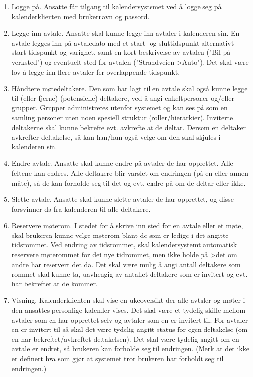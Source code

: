\begin{enumerate}

\item
Logge på. Ansatte får tilgang til kalendersystemet ved å logge seg på kalenderklienten med brukernavn og passord.

\item
Legge inn avtale. Ansatte skal kunne legge inn avtaler i kalenderen sin. En avtale legges inn på avtaledato med et start- og sluttidspunkt alternativt start-tidspunkt og varighet, samt en kort beskrivelse av avtalen ("Bil på verksted") og eventuelt sted for avtalen ("Strandveien
>Auto"). Det skal være lov å legge inn flere avtaler for overlappende tidspunkt.

\item
Håndtere møtedeltakere. Den som har lagt til en avtale skal også kunne legge til (eller fjerne) (potensielle) deltakere, ved å angi enkeltpersoner og/eller grupper. Grupper administreres utenfor systemet og kan ses på som en samling personer uten noen spesiell struktur (roller/hierarkier). Inviterte deltakerne skal kunne bekrefte evt. avkrefte at de deltar. Dersom en deltaker avkrefter deltakelse, så kan han/hun også velge om den skal skjules i kalenderen sin.

\item
Endre avtale. Ansatte skal kunne endre på avtaler de har opprettet. Alle feltene kan endres. Alle deltakere blir varslet om endringen (på en eller annen måte), så de kan forholde seg til det og evt. endre på om de deltar eller ikke.

\item
Slette avtale. Ansatte skal kunne slette avtaler de har opprettet, og disse forsvinner da fra kalenderen til alle deltakere.

\item
Reservere møterom. I stedet for å skrive inn sted for en avtale eller et møte, skal brukeren kunne velge møterom blant de som er ledige i det angitte tidsrommet. Ved endring av tidsrommet, skal kalendersystemt automatisk reservere møterommet for det nye tidrommet, men ikke holde på
>det om andre har reservert det da. Det skal være mulig å angi antall deltakere som rommet skal kunne ta, uavhengig av antallet deltakere som er invitert og evt. har bekreftet at de kommer.

\item
Visning. Kalenderklienten skal vise en ukeoversikt der alle avtaler og møter i den ansattes personlige kalender vises. Det skal være et tydelig skille mellom avtaler som en har opprettet selv og avtaler som en er invitert til. For avtaler en er invitert til så skal det være tydelig angitt status for egen deltakelse (om en har bekreftet/avkreftet deltakelsen). Det skal være tydelig angitt om en avtale er endret, så brukeren kan forholde seg til endringen. (Merk at det ikke er definert hva som gjør at systemet tror brukeren har forholdt seg til endringen.)


\end{enumerate}
